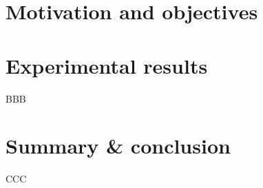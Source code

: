 \documentclass[12pt]{report}
\begin{document}
    \chapter*{Motivation and objectives}\label{ch:sec1}
    

    \chapter*{Experimental results}\label{ch:sec2}
    BBB

    \chapter*{Summary \& conclusion}\label{ch:sec3}
    CCC
\end{document}
